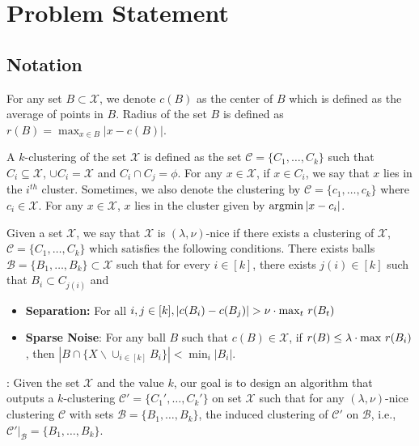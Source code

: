 \documentclass[11pt]{article}
\newcommand{\mc}{\mathcal}
\begin{document}
\section{Problem Statement}

\subsection{Notation}
For any set $B\subset \mc X$, we denote $c(B)$ as the center of $B$ which is defined as the average of points in $B$. Radius of the set $B$ is defined as $r(B)=\max_{x\in B} |x-c(B)|$. 

A $k$-clustering of the set $\mc X$ is defined as the set $\mc C = \{C_1,\ldots,C_k\}$ such that $C_i \subseteq \mc X$, $\cup C_i = \mc X$ and $C_i \cap C_j = \phi$. For any $x \in \mc X$, if $x \in C_i$, we say that $x$ lies in the $i^{th}$ cluster. Sometimes, we also denote the clustering by $\mc C = \{c_1,\ldots,c_k\}$ where $c_i \in \mc X$. For any $x \in \mc X$, $x$ lies in the cluster given by $\argmin |x-c_i|$.

\begin{definition}
Given a set $\mc X$, we say that $\mc X$ is $(\lambda,\nu)$-nice if there exists a clustering of $\mc X$, $\mc C=\{C_1,\ldots,C_k\}$ which satisfies the following conditions. There exists balls $\mc B=\{B_1,\ldots,B_k\}\subset \mathcal{X}$ such that for every $i\in[k]$, there exists $j(i)\in[k]$ such that $B_i\subset C_{j(i)}$ and
\begin{itemize}
\item{\bf{Separation}:} For all $i,j\in[k], |c(B_i)-c(B_j)| > \nu\cdot\max_t \thinspace r(B_t)$
\item{\bf{Sparse Noise}}: For any ball $B$ such that $c(B)\in \mathcal{X}$, if $r(B)\leq \lambda \cdot \max \thinspace r(B_i)$, then $|B\cap \{X \backslash \cup_{i\in[k]} B_i\}| < \min_i |B_i|$.
\end{itemize}
\label{defn:niceness}
\end{definition}

: Given the set $\mc X$ and the value $k$, our goal is to design an algorithm that outputs a $k$-clustering $\mc C' =\{C_1',\ldots,C_k'\}$ on set $\mc X$ such that  for any $(\lambda,\nu)$-nice clustering $\mc C$ with sets $\mc B = \{B_1,\ldots,B_k\}$, the induced clustering of $\mc C'$ on $\mc B$, i.e., $\mc C'|_\mc B = \{B_1,\ldots,B_k\}$. 
\end{document}
